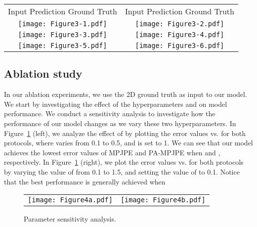 \documentclass{bmvc2k}
\begin{document}
\begin{figure*}[!htb]
\centering
\setlength{\tabcolsep}{7pt}
\begin{tabular}{cc}
\hspace*{.25in} Input\hspace*{.2in} Prediction\hspace*{.1in} Ground Truth & \hspace*{.25in} Input\hspace*{.25in} Prediction\hspace*{.1in} Ground Truth \\
\texttt{[image: Figure3-1.pdf]} & \texttt{[image: Figure3-2.pdf]}\\
\texttt{[image: Figure3-3.pdf]} & \texttt{[image: Figure3-4.pdf]}\\
\texttt{[image: Figure3-5.pdf]} & \texttt{[image: Figure3-6.pdf]}
\end{tabular}
\caption{Qualitative results obtained by our model on the Human3.6M test set.}
\label{Fig:visual}
\end{figure*}

\subsection{Ablation study}
In our ablation experiments, we use the 2D ground truth as input to our model. We start by investigating the effect of the hyperparameters  and  on model performance. We conduct a sensitivity analysis to investigate how the performance of our model changes as we vary these two hyperparameters. In Figure~\ref{Fig:alphabeta} (left), we analyze the effect of  by plotting the error values vs.  for both protocols, where  varies from 0.1 to 0.5, and  is set to 1. We can see that our model achieves the lowest error values of MPJPE and PA-MPJPE when  and , respectively. In Figure~\ref{Fig:alphabeta} (right), we plot the error values vs.  for both protocols by varying the value of  from 0.1 to 1.5, and setting the value of  to 0.1. Notice that the best performance is generally achieved when 

\begin{figure}[!htb]
\centering
\setlength{\tabcolsep}{5pt}
\begin{tabular}{cc}
\texttt{[image: Figure4a.pdf]} & \texttt{[image: Figure4b.pdf]}
\end{tabular}
\caption{Parameter sensitivity analysis.}
\label{Fig:alphabeta}
\end{figure}
\end{document}
